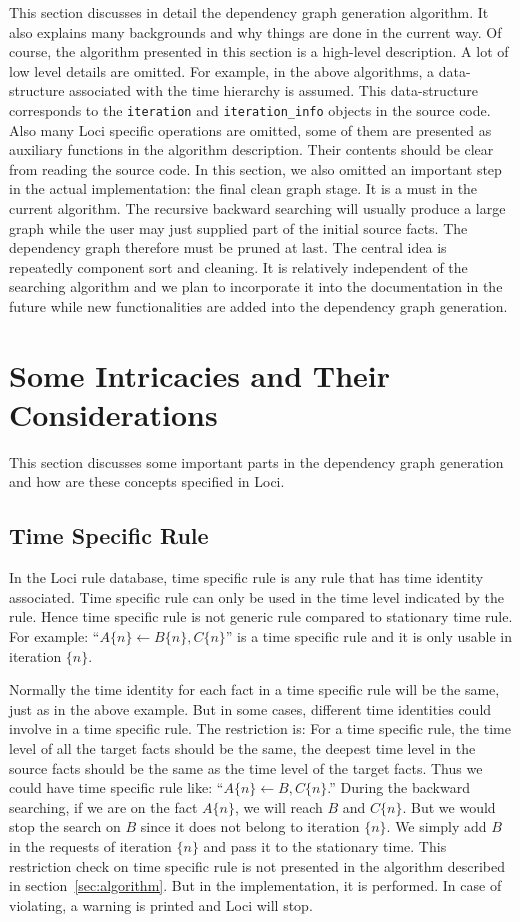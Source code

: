 \documentclass{article}
\begin{document}
This section discusses in detail the dependency graph generation
algorithm. It also explains many backgrounds and why things are done in
the current way. Of course, the algorithm presented in this section is
a high-level description. A lot of low level details are omitted. For
example, in the above algorithms, a data-structure associated with the
time hierarchy is assumed. This data-structure corresponds to the
\texttt{iteration} and \texttt{iteration\_info} objects in the source
code. Also many Loci specific operations are omitted, some of them are
presented as auxiliary functions in the algorithm description. Their
contents should be clear from reading the source code. In this
section, we also omitted an important step in the actual
implementation: the final clean graph stage. It is a must in the
current algorithm. The recursive backward searching will usually
produce a large graph while the user may just supplied part of the
initial source facts. The dependency graph therefore must be pruned at
last. The central idea is repeatedly component sort and cleaning. It
is relatively independent of the searching algorithm and we plan to
incorporate it into the documentation in the future while new
functionalities are added into the dependency graph generation.

\section{Some Intricacies and Their Considerations}
\label{sec:consider}
This section discusses some important parts in the dependency graph
generation and how are these concepts specified in Loci.

\subsection{Time Specific Rule}
In the Loci rule database, time specific rule is any rule that has
time identity associated. Time specific rule can only be used in the
time level indicated by the rule. Hence time specific rule is not
generic rule compared to stationary time rule. For example: 
``$A\{n\} \gets B\{n\},C\{n\}$'' is a time specific rule and it is
only usable in iteration $\{n\}$. 

Normally the time identity for each fact in a time specific rule will
be the same, just as in the above example. But in some cases,
different time identities could involve in a time specific rule. The
restriction is: For a time specific rule, the time level of all the
target facts should be the same, the deepest time level in
the source facts should be the same as the time level of the target
facts. Thus we could have time specific rule like: 
``$A\{n\} \gets B,C\{n\}$.'' During the backward searching, if we are
on the fact $A\{n\}$, we will reach $B$ and $C\{n\}$. But we would
stop the search on $B$ since it does not belong to iteration
$\{n\}$. We simply add $B$ in the requests of iteration $\{n\}$ and
pass it to the stationary time. This restriction check on time
specific rule is not presented in the algorithm described in
section~\ref{sec:algorithm}. But in the implementation, it is
performed. In case of violating, a warning is printed and Loci will
stop. 
\end{document}
